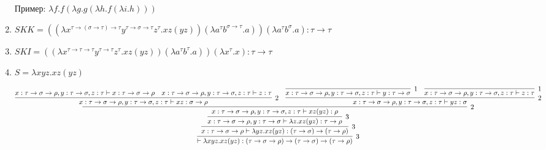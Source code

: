 \documentclass[12pt, landscape, a3paper] {article}
\begin{document}
\begin{enumerate}
        Пример: $\lambda f.f(\lambda g.g(\lambda h.f(\lambda i.h)))$

    \item $S K K = ((\lambda x^{\tau\to(\sigma\to\tau)\to\tau}y^{\tau\to\sigma\to\tau}z^\tau.xz(yz))(\lambda a^\tau b^{\sigma\to\tau}.a))(\lambda a^\tau b^\sigma.a):\tau\to\tau$

    \item $S K I=((\lambda x^{\tau\to\tau\to\tau}y^{\tau\to\tau}z^\tau.xz(yz))(\lambda a^\tau b^\tau.a))(\lambda x^\tau.x):\tau\to\tau$

    \item $S = \lambda xyz.xz(yz)$

        $$
        \infer[3]
        {
            \vdash \lambda xyz.xz(yz):(\tau\to\sigma\to\rho)\to(\tau\to\sigma)\to(\tau\to\rho)
        }
        {
            \infer[3]
            {
                x:\tau\to\sigma\to\rho \vdash \lambda yz.xz(yz):(\tau\to\sigma)\to(\tau\to\rho)
            }
            {
                \infer[3]
                {
                    x:\tau\to\sigma\to\rho, y:\tau\to\sigma \vdash \lambda z.xz(yz):\tau\to\rho
                }
                {
                    \infer[2]
                    {
                        x:\tau\to\sigma\to\rho, y:\tau\to\sigma, z:\tau \vdash xz(yz):\rho
                    }
                    {
                        \infer[2]
                        {
                            x:\tau\to\sigma\to\rho, y:\tau\to\sigma, z:\tau \vdash xz:\sigma\to\rho
                        }
                        {
                            x:\tau\to\sigma\to\rho, y:\tau\to\sigma, z:\tau \vdash x:\tau\to\sigma\to\rho
                            \quad
                            x:\tau\to\sigma\to\rho, y:\tau\to\sigma, z:\tau \vdash z:\tau
                        }
                        \quad
                        \infer[2]
                        {
                            x:\tau\to\sigma\to\rho, y:\tau\to\sigma, z:\tau \vdash yz:\sigma
                        }
                        {
                            \infer[1]{x:\tau\to\sigma\to\rho, y:\tau\to\sigma, z:\tau \vdash y:\tau\to\sigma}{}
                            \quad
                            \infer[1]{x:\tau\to\sigma\to\rho, y:\tau\to\sigma, z:\tau \vdash z:\tau}{}
                        }
                    }
                }
            }
        }
        $$

\end{enumerate}
\end{document}
